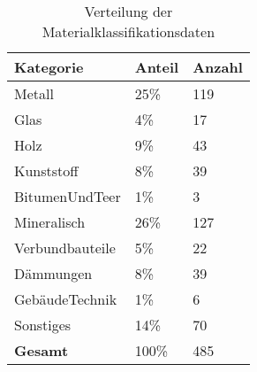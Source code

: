 \begin{table}[h]
	\centering
	\begin{tabular}{|l|l|l|}
		\hline
		\textbf{Kategorie} & \textbf{Anteil} & \textbf{Anzahl} \\ \hline
		Metall  & 25\% & 119 \\ \hline
		Glas & 4\% & 17 \\ \hline
		Holz & 9\% & 43 \\ \hline
		Kunststoff & 8\% & 39 \\ \hline
		BitumenUndTeer & 1\% & 3 \\ \hline
		Mineralisch & 26\% & 127 \\ \hline
		Verbundbauteile & 5\% & 22 \\ \hline
		Dämmungen & 8\% & 39 \\ \hline
		GebäudeTechnik & 1\% & 6 \\ \hline
		Sonstiges & 14\% & 70 \\ \hline
		\textbf{Gesamt} & 100\% & 485 \\ \hline
	\end{tabular}
	\caption{Verteilung der Materialklassifikationsdaten}
	\label{t:distribution}
\end{table}